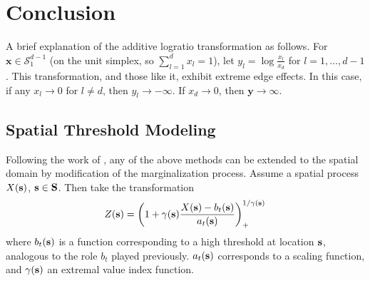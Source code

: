 
\section{Conclusion}



A brief explanation of the additive logratio transformation
as follows.  For $\bm{x}\in \mathcal{S}_{1}^{d-1}$ (on the unit simplex, so $\sum_{l = 1}^d x_l = 1$),
let $y_l = \log\frac{x_l}{x_d}$ for $l = 1,\ldots,d-1$. This transformation, and those like it,
exhibit extreme edge effects.  In this case, if any $x_l\to0$ for $l \neq d$, then $y_l\to-\infty$.
If $x_d \to 0$, then $\bm{y}\to\infty$.


\subsection{Spatial Threshold Modeling}
Following the work of \cite{ferreira2014}, any of the above methods can be
  extended to the spatial domain by modification of the marginalization process.
  Assume a spatial process $X({\bf s})$, ${\bf s}\in {\bf S}$.  Then take the
  transformation
\begin{equation}
  \label{eqn:spatial}
  Z({\bf s}) = \left(1 + \gamma({\bf s})\frac{X({\bf s}) - b_t({\bf s})}{a_t({\bf s})}\right)_{+}^{1/{\gamma({\bf s})}}
\end{equation}
  where $b_t({\bf s})$ is a function corresponding to a high threshold at location
  ${\bf s}$, analogous to the role $b_t$ played previously. $a_t({\bf s})$
  corresponds to a scaling function, and $\gamma({\bf s})$ an extremal value index
  function.


